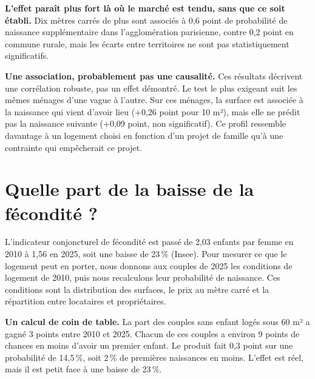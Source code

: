 \documentclass[11pt,a4paper]{article}
\begin{document}
\textbf{L'effet paraît plus fort là où le marché est tendu, sans que ce soit établi.} Dix mètres carrés de plus sont associés à 0,6 point de probabilité de naissance supplémentaire dans l'agglomération parisienne, contre 0,2 point en commune rurale, mais les écarts entre territoires ne sont pas statistiquement significatifs.

\textbf{Une association, probablement pas une causalité.} Ces résultats décrivent une corrélation robuste, pas un effet démontré. Le test le plus exigeant suit les mêmes ménages d'une vague à l'autre. Sur ces ménages, la surface est associée à la naissance qui vient d'avoir lieu (+0,26 point pour 10 m²), mais elle ne prédit pas la naissance suivante (+0,09 point, non significatif). Ce profil ressemble davantage à un logement choisi en fonction d'un projet de famille qu'à une contrainte qui empêcherait ce projet.

\section{Quelle part de la baisse de la fécondité ?}

L'indicateur conjoncturel de fécondité est passé de 2,03 enfants par femme en 2010 à 1,56 en 2025, soit une baisse de 23\,\% (Insee). Pour mesurer ce que le logement peut en porter, nous donnons aux couples de 2025 les conditions de logement de 2010, puis nous recalculons leur probabilité de naissance. Ces conditions sont la distribution des surfaces, le prix au mètre carré et la répartition entre locataires et propriétaires.

\noindent\colorbox{fond}{\begin{minipage}{\dimexpr\linewidth-2\fboxsep\relax}
\small\textbf{Un calcul de coin de table.} La part des couples sans enfant logés sous 60 m² a gagné 3 points entre 2010 et 2025. Chacun de ces couples a environ 9 points de chances en moins d'avoir un premier enfant. Le produit fait 0,3 point sur une probabilité de 14,5\,\%, soit 2\,\% de premières naissances en moins. L'effet est réel, mais il est petit face à une baisse de 23\,\%.
\end{minipage}}
\end{document}
